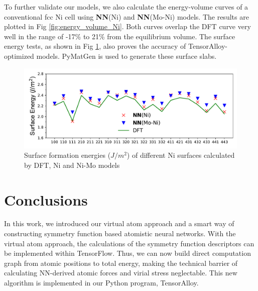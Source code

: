 \documentclass[final,1p,times]{elsarticle}
\begin{document}
To further validate our models, we also calculate the energy-volume curves of a 
conventional fcc Ni cell using \textbf{NN}(Ni) and \textbf{NN}(Mo-Ni) models. 
The results are plotted in Fig \ref{fig:energy_volume_Ni}. Both curves overlap 
the DFT curve very well in the range of -17\% to 21\% from the equilibrium 
volume. The surface energy tests, as shown in Fig \ref{fig:surface_energy_Ni}, 
also proves the accuracy of TensorAlloy-optimized models. 
PyMatGen\cite{pymatgen,pymatgen-1} is used to generate these surface slabs.

% 
%
\begin{figure}[h!]
    \centering
    \includegraphics[scale=0.65]{figures/Ni_surface_energy.pdf}
\caption{\label{fig:surface_energy_Ni} Surface formation energies ($J/m^2$) of 
different Ni surfaces calculated by DFT, Ni and Ni-Mo models}
\end{figure}

% 
%
\section{Conclusions}
\label{section:conclusions}

In this work, we introduced our virtual atom approach and a smart way of 
constructing symmetry function based atomistic neural networks. 
With the virtual atom approach, the calculations of the symmetry function 
descriptors can be implemented within TensorFlow. Thus, we can now build direct 
computation graph from atomic positions to total energy, making the technical 
barrier of calculating NN-derived atomic forces and virial stress neglectable.
This new algorithm is implemented in our Python program, TensorAlloy.
\end{document}
